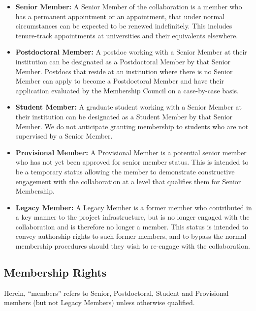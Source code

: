 \begin{itemize}

\item {\bf Senior Member:} A Senior Member of the collaboration is a member who has a permanent appointment or an appointment, that under normal circumstances can be expected to be renewed indefinitely.   This includes tenure-track appointments at universities and their equivalents elsewhere.  

\item {\bf Postdoctoral Member:} A postdoc working with a Senior Member at their institution can be designated as a Postdoctoral Member by that Senior Member.  Postdocs that reside at an institution where there is no Senior Member can apply to become a Postdoctoral Member and have their application evaluated by the Membership Council on a case-by-case basis. 

\item {\bf Student Member:} A graduate student working with a Senior Member at their institution can be designated as a Student Member by that Senior Member.  We do not anticipate granting membership to students who are not supervised by a Senior Member.

\item {\bf Provisional Member:}  A Provisional Member is a potential senior member who has not yet been approved for senior member status.  This is intended to be a temporary status allowing the member to demonstrate constructive engagement with the collaboration at a level that qualifies them for Senior Membership.

\item {\bf Legacy Member:}  A Legacy Member is a former member who contributed in a key manner to the project infrastructure, but is no longer engaged with the collaboration and is therefore no longer a member.  This status is intended to convey authorship rights to such former members, and to bypass the normal membership procedures should they wish to re-engage with the collaboration.

\end{itemize}



\subsection{Membership Rights}

Herein, ``members'' refers to Senior, Postdoctoral, Student and Provisional members (but not Legacy Members) unless otherwise qualified.  

